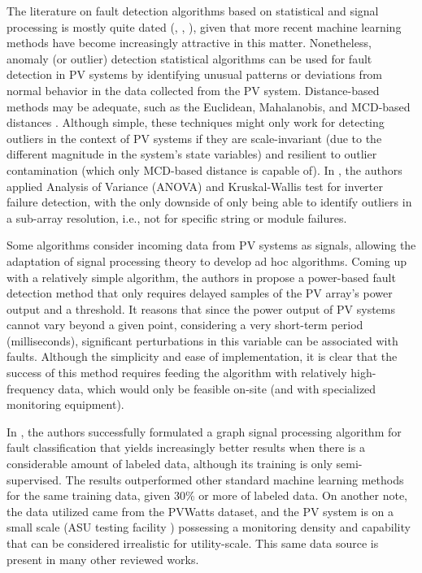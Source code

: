 The literature on fault detection algorithms based on statistical and signal processing is mostly quite dated (\cite{Buddha2012}, \cite{Zhao2014}, \cite{Vergura2008}), given that more recent machine learning methods have become increasingly attractive in this matter. Nonetheless, anomaly (or outlier) detection statistical algorithms can be used for fault detection in PV systems by identifying unusual patterns or deviations from normal behavior in the data collected from the PV system. Distance-based methods may be adequate, such as the Euclidean, Mahalanobis, and MCD-based distances \cite{Braun2011}. Although simple, these techniques might only work for detecting outliers in the context of PV systems if they are scale-invariant (due to the different magnitude in the system's state variables) and resilient to outlier contamination (which only MCD-based distance is capable of). In \cite{Vergura2008}, the authors applied Analysis of Variance (ANOVA) and Kruskal-Wallis test for inverter failure detection, with the only downside of only being able to identify outliers in a sub-array resolution, i.e., not for specific string or module failures.

Some algorithms consider incoming data from PV systems as signals, allowing the adaptation of signal processing theory to develop ad hoc algorithms. Coming up with a relatively simple algorithm, the authors in \cite{Iles2021} propose a power-based fault detection method that only requires delayed samples of the PV array's power output and a threshold. It reasons that since the power output of PV systems cannot vary beyond a given point, considering a very short-term period (milliseconds), significant perturbations in this variable can be associated with faults. Although the simplicity and ease of implementation, it is clear that the success of this method requires feeding the algorithm with relatively high-frequency data, which would only be feasible on-site (and with specialized monitoring equipment).

In \cite{Fan2020}, the authors successfully formulated a graph signal processing algorithm for fault classification that yields increasingly better results when there is a considerable amount of labeled data, although its training is only semi-supervised. The results outperformed other standard machine learning methods for the same training data, given 30\% or more of labeled data. On another note, the data utilized came from the PVWatts \cite{Dobos2013} dataset, and the PV system is on a small scale (ASU testing facility \cite{Rao2016}) possessing a monitoring density and capability that can be considered irrealistic for utility-scale. This same data source is present in many other reviewed works.

